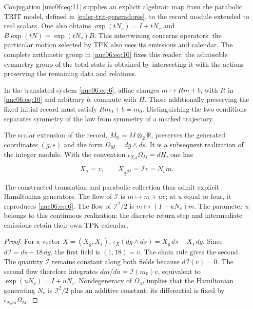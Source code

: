Conjugation \eqref{nuc06:eq:11} supplies an explicit algebraic map from the parabolic TRIT model, defined in \cref{euler-trit-generadores}, to the record module extended to real scalars. One also obtains \(\exp(tN_v)=I+tN_v\) and \(B\exp(tN)=\exp(tN_v)B\). This intertwining concerns operators: the particular motion selected by TPK also uses its emissions and calendar. The complete arithmetic group in \eqref{nuc06:eq:10} fixes this reader; the admissible symmetry group of the total state is obtained by intersecting it with the actions preserving the remaining data and relations.

In the translated system \eqref{nuc06:eq:6}, affine changes \(m\mapsto Rm+b\), with \(R\) in \eqref{nuc06:eq:10} and arbitrary \(b\), commute with \(H\). Those additionally preserving the fixed initial record must satisfy \(Rm_0+b=m_0\). Distinguishing the two conditions separates symmetry of the law from symmetry of a marked trajectory.

\begin{theorem}
\label{nuc06:variacional}

The scalar extension of the record, \(M_{\mathbb R}=M\otimes_{\mathbb Z}\mathbb R\), preserves the generated coordinates \((g,s)\) and the form \(\Omega_M=dg\wedge ds\). It is a subsequent realization of the integer module. With the convention \(\iota_{X_H}\Omega_M=dH\), one has

\begin{equation}
X_{\mathcal I}=v,\qquad
X_{\frac12\mathcal I^2}=\mathcal I v=N_vm.
\label{nuc06:eq:12a}
\end{equation}

The constructed translation and parabolic collection thus admit explicit Hamiltonian generators. The flow of \(\mathcal I\) is \(m\mapsto m+uv\); at \(u\) equal to four, it reproduces \eqref{nuc06:eq:6}. The flow of \(\mathcal I^2/2\) is \(m\mapsto(I+uN_v)m\). The parameter \(u\) belongs to this continuous realization; the discrete return step and intermediate emissions retain their own TPK calendar.
\end{theorem}

\begin{proof}
For a vector \(X=(X_g,X_s)\), \(\iota_X(dg\wedge ds)=X_g\,ds-X_s\,dg\). Since \(d\mathcal I=ds-18\,dg\), the first field is \((1,18)=v\). The chain rule gives the second. The quantity \(\mathcal I\) remains constant along both fields because \(d\mathcal I(v)=0\). The second flow therefore integrates \(dm/du=\mathcal I(m_0)v\), equivalent to \(\exp(uN_v)=I+uN_v\). Nondegeneracy of \(\Omega_M\) implies that the Hamiltonian generating \(N_v\) is \(\mathcal I^2/2\) plus an additive constant: its differential is fixed by \(\iota_{N_vm}\Omega_M\).
\end{proof}

